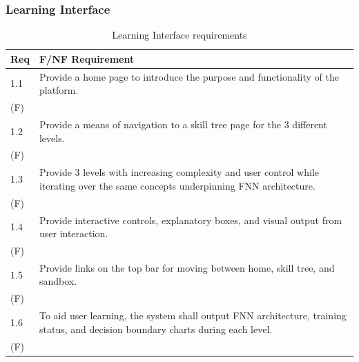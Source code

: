 \documentclass{article}
\begin{document}

\subsubsection{Learning Interface}

\begin{table}[H]
\centering
\begin{tabular}{|p{0.7cm}|p{14cm}|}
\hline
\textbf{Req} & \textbf{F/NF Requirement} \\
\hline
1.1 &
Provide a home page to introduce the purpose and functionality of the platform. \\
(F) & \\
\hline
1.2 &
Provide a means of navigation to a skill tree page for the 3 different levels. \\
(F) & \\
\hline
1.3 &
Provide 3 levels with increasing complexity and user control while iterating over the same concepts underpinning FNN architecture. \\
(F) & \\
\hline
1.4 &
Provide interactive controls, explanatory boxes, and visual output from user interaction. \\
(F) & \\
\hline
1.5 &
Provide links on the top bar for moving between home, skill tree, and sandbox. \\
(F) & \\
\hline
1.6 &
To aid user learning, the system shall output FNN architecture, training status, and decision boundary charts during each level. \\
(F) & \\
\hline
\end{tabular}
\caption{Learning Interface requirements}
\end{table}
\end{document}
